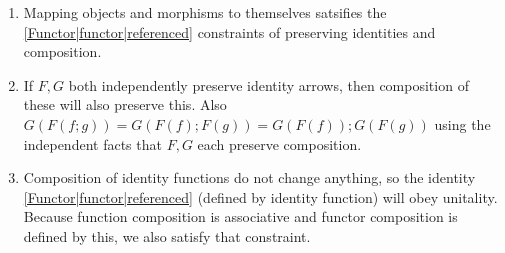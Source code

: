 \begin{enumerate}
    \item  Mapping objects and morphisms to themselves satsifies the \ref{Functor|functor|referenced} constraints of preserving identities and composition.
    \item If $F,G$ both independently preserve identity arrows, then composition of these will also preserve this. Also $G(F(f;g))=G(F(f);F(g))=G(F(f));G(F(g))$ using the independent facts that $F,G$ each preserve composition.
    \item Composition of identity functions do not change anything, so the identity \ref{Functor|functor|referenced} (defined by identity function) will obey unitality. Because function composition is associative and functor composition is defined by this, we also satisfy that constraint.

  \end{enumerate}
